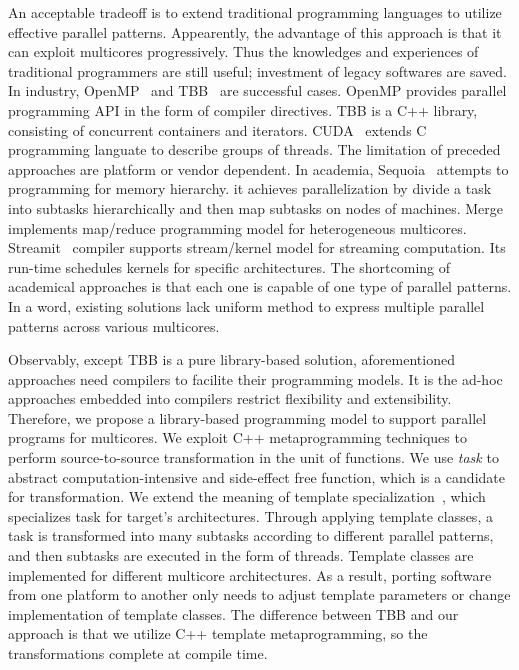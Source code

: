 An acceptable tradeoff is to extend traditional programming
languages to utilize effective parallel patterns. Appearently, the advantage of
this approach is that it can exploit multicores progressively. Thus the
knowledges and
experiences of traditional programmers are still useful; investment
of legacy softwares are saved. In industry, OpenMP~\cite{openmp}  and
TBB~\cite{tbb} are successful cases. OpenMP provides parallel
programming API in the form of compiler directives. TBB is a C++ library, consisting of concurrent containers and
iterators. CUDA~\cite{cuda} extends C programming languate to describe
groups of threads. The limitation of preceded approaches are
platform or vendor dependent. In academia,
Sequoia~\cite{sequoia} attempts to programming for memory hierarchy. it
achieves parallelization by divide a task into subtasks hierarchically and then map
subtasks on nodes of machines. Merge~\cite{merge} implements
map/reduce programming model for heterogeneous
multicores. Streamit~\cite{ThiesKA02} compiler supports stream/kernel
model for streaming computation. Its run-time schedules kernels for specific architectures. The shortcoming of academical approaches is that each one
is capable of one type of parallel patterns.  In a word, existing solutions
lack uniform method to express multiple parallel patterns
across various multicores.


Observably, except TBB is a pure library-based solution, aforementioned
approaches need compilers to facilite their programming models. It is
the ad-hoc approaches embedded into compilers restrict flexibility and
extensibility. Therefore, we propose a library-based programming model to
support parallel programs for multicores. We exploit C++
metaprogramming techniques to perform source-to-source transformation
in the unit of functions. We use \emph{task} to abstract
computation-intensive and side-effect free function, which is a
candidate for transformation. We extend the meaning of template
specialization~\cite{tcpl}, which specializes task for target's
architectures.  Through applying template classes, a task is
transformed into many subtasks according to different parallel
patterns, and then subtasks are executed in the form of threads.
Template classes are implemented for different multicore
architectures. As a result, porting software from one platform to another only
needs to adjust template parameters or change implementation of
template classes. The difference between TBB and our approach is that
we utilize C++ template metaprogramming, so the transformations complete
at compile time. 

